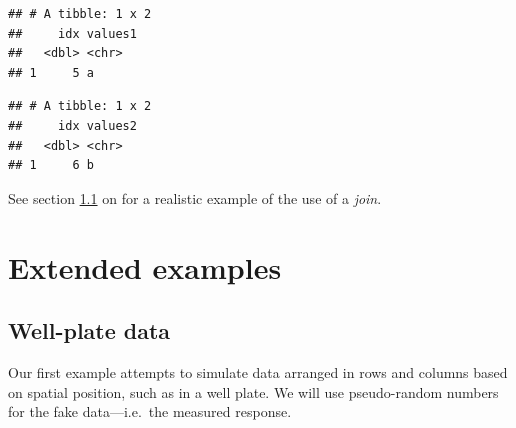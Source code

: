 \documentclass[krantz2]{krantz}\usepackage{knitr}%
\begin{document}
\begin{knitrout}\footnotesize
{}\color{fgcolor}\begin{kframe}
\begin{alltt}
\end{alltt}


{\ttfamily\noindent\itshape{}}\begin{verbatim}
## # A tibble: 1 x 2
##     idx values1
##   <dbl> <chr>  
## 1     5 a
\end{verbatim}
\end{kframe}
\end{knitrout}

\begin{knitrout}\footnotesize
{}\color{fgcolor}\begin{kframe}
\begin{alltt}
\end{alltt}


{\ttfamily\noindent\itshape{}}\begin{verbatim}
## # A tibble: 1 x 2
##     idx values2
##   <dbl> <chr>  
## 1     6 b
\end{verbatim}
\end{kframe}
\end{knitrout}

See section \ref{sec:dataex:well:plate} on \pageref{sec:dataex:well:plate} for a realistic example of the use of a \emph{join}.

\section{Extended examples}\label{sec:dataex}

\subsection{Well-plate data}\label{sec:dataex:well:plate}

Our first example attempts to simulate data arranged in rows and columns based on spatial position, such as in a well plate. We will use pseudo-random numbers for the fake data---i.e.\ the measured response.
\end{document}

